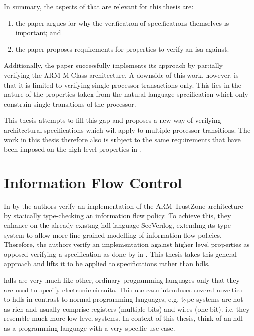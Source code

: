 In summary, the aspects of \cite{Reid17} that are relevant for this thesis are:
\begin{enumerate}[label=\alph*)]
    \item the paper argues for why the verification of specifications themselves is important; and
    \item the paper proposes requirements for properties to verify an \gls{isa} against.
\end{enumerate}

Additionally, the paper successfully implements its approach by partially verifying the ARM M-Class architecture.
A downside of this work, however, is that it is limited to verifying single processor transactions only.
This lies in the nature of the properties taken from the natural language specification which only constrain single transitions of the processor.

This thesis attempts to fill this gap and proposes a new way of verifying architectural specifications which will apply to multiple processor transitions.
The work in this thesis therefore also is subject to the same requirements that have been imposed on the high-level properties in \cite{Reid17}.

\section{Information Flow Control}
\label{sec:bg-ifc}

In  \cite{Ferraiuolo17} by \citeauthor{Ferraiuolo17} the authors verify an implementation of the ARM TrustZone architecture by statically type-checking an information flow policy.
To achieve this, they enhance on the already existing \gls{hdl} language SecVerilog, extending its type system to allow more fine grained modelling of information flow policies.
Therefore, the authors verify an implementation against higher level properties as opposed verifying a specification as done by \citeauthor{Reid17} in \cite{Reid17}.
This thesis takes this general approach and lifts it to be applied to specifications rather than \glspl{hdl}.

\glspl{hdl} are very much like other, ordinary programming languages only that they are used to specify electronic circuits.
This use case introduces several novelties to \glspl{hdl} in contrast to normal programming languages, e.g. type systems are not as rich and usually comprise registers (multiple bits) and wires (one bit). i.e. they resemble much more low level systems.
In context of this thesis, think of an \gls{hdl} as a programming language with a very specific use case.

